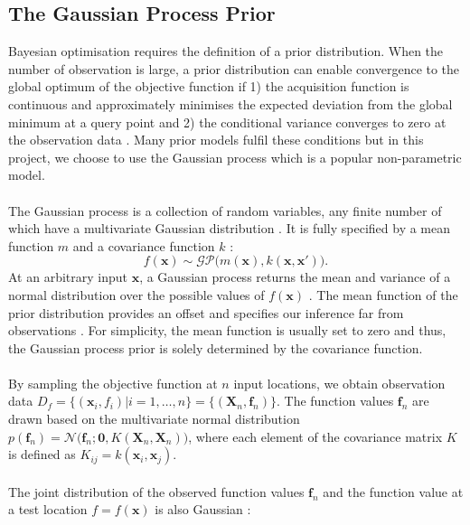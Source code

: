 \documentclass[a4paper,11pt]{report}
\begin{document}
\subsection{The Gaussian Process Prior}
Bayesian optimisation requires the definition of a prior distribution. When the number of observation is large, a prior distribution can enable convergence to the global optimum of the objective function if 1) the acquisition function is continuous and  approximately minimises the expected deviation from the global minimum at a query point  and 2) the conditional variance converges to zero at the observation data \cite{mockus1994application}.  Many prior models fulfil these conditions but in this project, we choose to use the Gaussian process which is a popular non-parametric model.
\\\\
The Gaussian process is a collection of random variables, any finite number of which have a multivariate Gaussian distribution \cite{rasmussen2006gaussian}. It is fully specified by a mean function $m$ and 
a covariance function $k$ \cite{rasmussen2006gaussian}: 
	\begin{equation}
	f(\mathbf{x}) \sim \mathcal{GP} \big( m(\mathbf{x}),k(\mathbf{x},\mathbf{x}')\big).
	\end{equation}
\noindent	
At an arbitrary input $\mathbf{x} $, a Gaussian process returns the mean and variance of a normal distribution over the possible values of  $f(\mathbf{x}) $ \cite{brochu2010tutorial}. The mean function of the prior distribution provides an offset and specifies our inference far from observations \cite{C24 Advanced probability notes}. For simplicity, the mean function is usually set to zero \cite{rasmussen2006gaussian} and thus, the Gaussian process prior is solely determined by the covariance function.
\\\\
By sampling the objective function at $n$ input locations, we obtain observation data $D_{f}=\{(\mathbf{x}_i,f_i) \vert i = 1, \dots, n \}=\{(\mathbf{X}_n,\mathbf{f}_n)\}$.  The function values  $\mathbf{f}_n$ are drawn based on the multivariate normal distribution $p(\mathbf{f}_n)= \mathcal{N}\big( \mathbf{f}_n; \mathbf{0},K( \mathbf{X}_n,\mathbf{X}_n) \big)$, where each element of the covariance matrix $K$ is defined as $K_{ij}=k(\mathbf{x}_i,\mathbf{x}_j)$.
\\\\
The joint distribution of the observed function values $\mathbf{f}_n$ and the function value at a test location $ f=f(\mathbf{x}) $ is also Gaussian \cite{rasmussen2006gaussian} :
\end{document}
